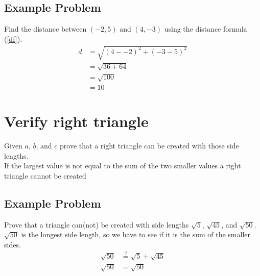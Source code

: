 \documentclass{article}
\begin{document}
			\subsection{Example Problem}
				Find the distance between $(-2, 5)$ and $(4, -3)$ using the distance formula (\ref{df}).
				\begin{align*}
					d & = \sqrt{(4--2)^2 + (-3-5)^2} \\
					  & = \sqrt{36 + 64} \\
					  & = \sqrt{100} \\
					  & = 10
				\end{align*}
	
		\section{Verify right triangle}
			Given $a$, $b$, and $c$ prove that a right triangle can be created with those side lengths.\\
			If the largest value is not equal to the sum of the two smaller values a right triangle cannot be created
			
			\subsection{Example Problem}
				Prove that a triangle can(not) be created with side lengths $\sqrt{5}$, $\sqrt{45}$, and $\sqrt{50}$.\\
				$\sqrt{50}$ is the longest side length, so we have to see if it is the sum of the smaller sides.
				\begin{align*}
					\sqrt{50} &\stackrel{?}{=} \sqrt{5} + \sqrt{45} \\
					\sqrt{50} &= \sqrt{50}
				\end{align*}
		
\end{document}
